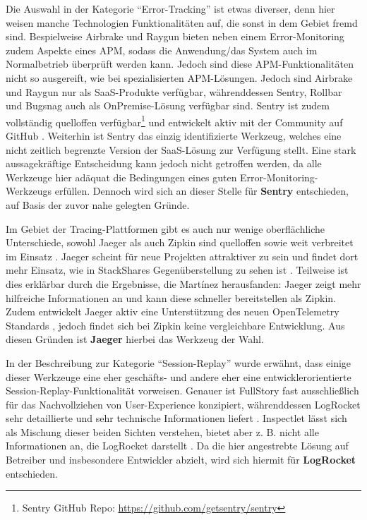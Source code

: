 

Die Auswahl in der Kategorie \enquote{Error-Tracking} ist etwas diverser, denn hier weisen manche Technologien Funktionalitäten auf, die sonst in dem Gebiet fremd sind. Bespielweise Airbrake und Raygun bieten neben einem Error-Monitoring zudem Aspekte eines APM, sodass die Anwendung/das System auch im Normalbetrieb überprüft werden kann. Jedoch sind diese APM-Funktionalitäten nicht so ausgereift, wie bei spezialisierten APM-Lösungen. Jedoch sind Airbrake und Raygun nur als SaaS-Produkte verfügbar, währenddessen Sentry, Rollbar und Bugsnag auch als OnPremise-Lösung verfügbar sind. Sentry ist zudem vollständig quelloffen verfügbar\footnote{Sentry GitHub Repo: \url{https://github.com/getsentry/sentry}} und entwickelt aktiv mit der Community auf GitHub \cite{GitHub}. Weiterhin ist Sentry das einzig identifizierte Werkzeug, welches eine nicht zeitlich begrenzte Version der SaaS-Lösung zur Verfügung stellt. Eine stark aussagekräftige Entscheidung kann jedoch nicht getroffen werden, da alle Werkzeuge hier adäquat die Bedingungen eines guten Error-Monitoring-Werkzeugs erfüllen. Dennoch wird sich an dieser Stelle für \textbf{Sentry} entschieden, auf Basis der zuvor nahe gelegten Gründe.



Im Gebiet der Tracing-Plattformen gibt es auch nur wenige oberflächliche Unterschiede, sowohl Jaeger als auch Zipkin sind quelloffen sowie weit verbreitet im Einsatz \cite{AnalysisOfDistributedTracingSystemsEffectOnPerformance}. Jaeger scheint für neue Projekten attraktiver zu sein und findet dort mehr Einsatz, wie in StackShares Gegenüberstellung zu sehen ist \cite{StackShareJaegerVsZipkin}. Teilweise ist dies erklärbar durch die Ergebnisse, die Mart{\'i}nez \etal \cite{ComparisonOfE2ETestingToolsForMicroservices} herausfanden: Jaeger zeigt mehr hilfreiche Informationen an und kann diese schneller bereitstellen als Zipkin. Zudem entwickelt Jaeger aktiv eine Unterstützung des neuen OpenTelemetry Standards \cite{JaegerOpenTelemetry}, jedoch findet sich bei Zipkin keine vergleichbare Entwicklung. Aus diesen Gründen ist \textbf{Jaeger} hierbei das Werkzeug der Wahl.



In der Beschreibung zur Kategorie \enquote{Session-Replay} wurde erwähnt, dass einige dieser Werkzeuge eine eher geschäfts- und andere eher eine entwicklerorientierte Session-Replay-Funktionalität vorweisen. Genauer ist FullStory fast ausschließlich für das Nachvollziehen von User-Experience konzipiert, währenddessen LogRocket sehr detaillierte und sehr technische Informationen liefert \cite{Webalyt}. Inspectlet lässt sich als Mischung dieser beiden Sichten verstehen, bietet aber z. B. nicht alle Informationen an, die LogRocket darstellt  \cite{Webalyt}. Da die hier angestrebte Lösung auf Betreiber und insbesondere Entwickler abzielt, wird sich hiermit für \textbf{LogRocket} entschieden.

